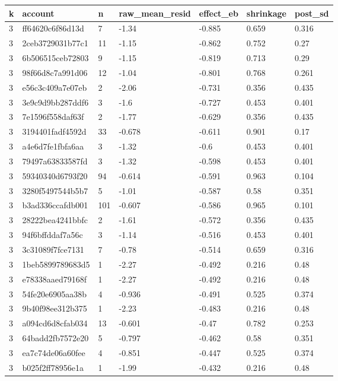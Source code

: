 \begin{tabular}{lllllll}
\toprule
k & account & n & raw\_mean\_resid & effect\_eb & shrinkage & post\_sd \\
\midrule
3 & ff64620c6f86d13d & 7 & -1.34 & -0.885 & 0.659 & 0.316 \\
3 & 2ceb3729031b77c1 & 11 & -1.15 & -0.862 & 0.752 & 0.27 \\
3 & 6b506515ceb72803 & 9 & -1.15 & -0.819 & 0.713 & 0.29 \\
3 & 98f66d8c7a991d06 & 12 & -1.04 & -0.801 & 0.768 & 0.261 \\
3 & e56c3c409a7e07eb & 2 & -2.06 & -0.731 & 0.356 & 0.435 \\
3 & 3e9c9d9bb287ddf6 & 3 & -1.6 & -0.727 & 0.453 & 0.401 \\
3 & 7e1596f558daf63f & 2 & -1.77 & -0.629 & 0.356 & 0.435 \\
3 & 3194401fadf4592d & 33 & -0.678 & -0.611 & 0.901 & 0.17 \\
3 & a4e6d7fe1fbfa6aa & 3 & -1.32 & -0.6 & 0.453 & 0.401 \\
3 & 79497a63833587fd & 3 & -1.32 & -0.598 & 0.453 & 0.401 \\
3 & 59340340d6793f20 & 94 & -0.614 & -0.591 & 0.963 & 0.104 \\
3 & 3280f5497544b5b7 & 5 & -1.01 & -0.587 & 0.58 & 0.351 \\
3 & b3ad336ccafdb001 & 101 & -0.607 & -0.586 & 0.965 & 0.101 \\
3 & 28222bea4241bbfc & 2 & -1.61 & -0.572 & 0.356 & 0.435 \\
3 & 94f6bffddaf7a56c & 3 & -1.14 & -0.516 & 0.453 & 0.401 \\
3 & 3c31089f7fce7131 & 7 & -0.78 & -0.514 & 0.659 & 0.316 \\
3 & 1beb5899789683d5 & 1 & -2.27 & -0.492 & 0.216 & 0.48 \\
3 & e78338aaed79168f & 1 & -2.27 & -0.492 & 0.216 & 0.48 \\
3 & 54fe20e6905aa38b & 4 & -0.936 & -0.491 & 0.525 & 0.374 \\
3 & 9b40f98ee312b375 & 1 & -2.23 & -0.483 & 0.216 & 0.48 \\
3 & a094cd6d8cfab034 & 13 & -0.601 & -0.47 & 0.782 & 0.253 \\
3 & 64badd2fb7572e20 & 5 & -0.797 & -0.462 & 0.58 & 0.351 \\
3 & ea7c74de06a60fee & 4 & -0.851 & -0.447 & 0.525 & 0.374 \\
3 & b025f2ff78956e1a & 1 & -1.99 & -0.432 & 0.216 & 0.48 \\

\end{tabular}
